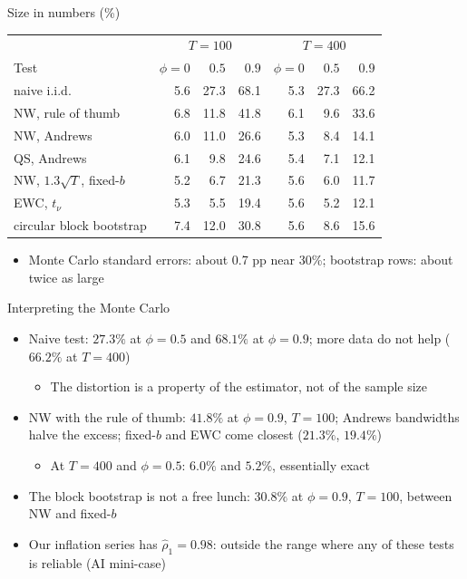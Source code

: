 \begin{frame}{Size in numbers (\%)}
\itemsize{\footnotesize}
\begin{center}
\footnotesize
\begin{tabular}{lrrrrrr}
\toprule
& \multicolumn{3}{c}{$T = 100$} & \multicolumn{3}{c}{$T = 400$} \\
Test & $\phi = 0$ & $0.5$ & $0.9$ & $\phi = 0$ & $0.5$ & $0.9$ \\
\midrule
naive i.i.d. & 5.6 & 27.3 & 68.1 & 5.3 & 27.3 & 66.2 \\
NW, rule of thumb & 6.8 & 11.8 & 41.8 & 6.1 & 9.6 & 33.6 \\
NW, Andrews & 6.0 & 11.0 & 26.6 & 5.3 & 8.4 & 14.1 \\
QS, Andrews & 6.1 & 9.8 & 24.6 & 5.4 & 7.1 & 12.1 \\
NW, $1.3\sqrt{T}$, fixed-$b$ & 5.2 & 6.7 & 21.3 & 5.6 & 6.0 & 11.7 \\
EWC, $t_\nu$ & 5.3 & 5.5 & 19.4 & 5.6 & 5.2 & 12.1 \\
circular block bootstrap & 7.4 & 12.0 & 30.8 & 5.6 & 8.6 & 15.6 \\
\bottomrule
\end{tabular}
\end{center}
\begin{itemize}
    \item Monte Carlo standard errors: about 0.7 pp near 30\%; bootstrap rows: about twice as large
\end{itemize}
\end{frame}

\begin{frame}{Interpreting the Monte Carlo}
\itemsize{\footnotesize}
\begin{itemize}
    \item Naive test: $27.3\%$ at $\phi = 0.5$ and $68.1\%$ at $\phi = 0.9$; more data do not help ($66.2\%$ at $T = 400$)
    \begin{itemize}
        \item The distortion is a property of the estimator, not of the sample size
    \end{itemize}
    \item NW with the rule of thumb: $41.8\%$ at $\phi = 0.9$, $T = 100$; Andrews bandwidths halve the excess; fixed-$b$ and EWC come closest ($21.3\%$, $19.4\%$)
    \begin{itemize}
        \item At $T = 400$ and $\phi = 0.5$: $6.0\%$ and $5.2\%$, essentially exact
    \end{itemize}
    \item The block bootstrap is not a free lunch: $30.8\%$ at $\phi = 0.9$, $T = 100$, between NW and fixed-$b$
    \item Our inflation series has $\hat\rho_1 = 0.98$: outside the range where any of these tests is reliable (AI mini-case)
\end{itemize}
\end{frame}

